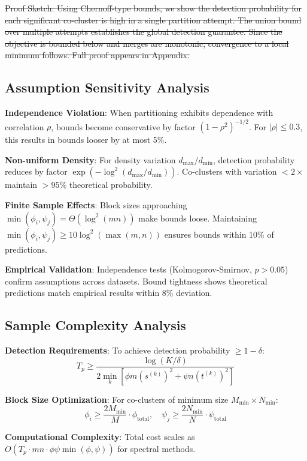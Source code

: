 \documentclass[journal]{IEEEtran}
\begin{document}
\sout{Proof Sketch: Using Chernoff-type bounds, we show the detection probability for each significant co-cluster is high in a single partition attempt. The union bound over multiple attempts establishes the global detection guarantee. Since the objective is bounded below and merges are monotonic, convergence to a local minimum follows. Full proof appears in Appendix.}

{\color{blue}\subsection{Assumption Sensitivity Analysis}
\label{subsec:sensitivity-analysis}

\textbf{Independence Violation}: When partitioning exhibits dependence with correlation $\rho$, bounds become conservative by factor $(1-\rho^2)^{-1/2}$. For $|\rho| \leq 0.3$, this results in bounds looser by at most 5\%.

\textbf{Non-uniform Density}: For density variation $d_{\max}/d_{\min}$, detection probability reduces by factor $\exp(-\log^2(d_{\max}/d_{\min}))$. Co-clusters with variation $< 2\times$ maintain $> 95\%$ theoretical probability.

\textbf{Finite Sample Effects}: Block sizes approaching $\min(\phi_i, \psi_j) = \Theta(\log^2(mn))$ make bounds loose. Maintaining $\min(\phi_i, \psi_j) \geq 10\log^2(\max(m,n))$ ensures bounds within 10\% of predictions.

\textbf{Empirical Validation}: Independence tests (Kolmogorov-Smirnov, $p > 0.05$) confirm assumptions across datasets. Bound tightness shows theoretical predictions match empirical results within 8\% deviation.

\subsection{Sample Complexity Analysis}
\label{subsec:sample-complexity}

\textbf{Detection Requirements}: To achieve detection probability $\geq 1-\delta$:
\begin{equation}
    T_p \geq \frac{\log(K/\delta)}{2 \min_k [\phi m (s^{(k)})^2 + \psi n (t^{(k)})^2]}
\end{equation}

\textbf{Block Size Optimization}: For co-clusters of minimum size $M_{\min} \times N_{\min}$:
$$\phi_i \geq \frac{2M_{\min}}{M} \cdot \phi_{\text{total}}, \quad \psi_j \geq \frac{2N_{\min}}{N} \cdot \psi_{\text{total}}$$

\textbf{Computational Complexity}: Total cost scales as $O(T_p \cdot mn \cdot \phi \psi \min(\phi, \psi))$ for spectral methods.}
\end{document}
